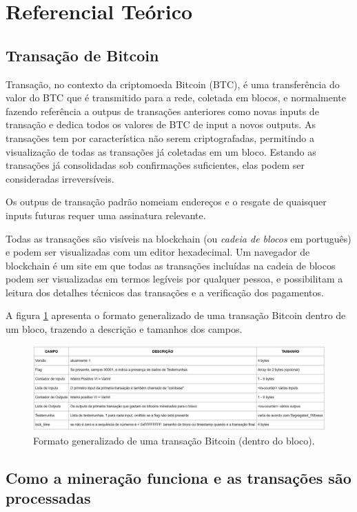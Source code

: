 \documentclass[conference]{IEEEtran}
\begin{document}
\section{Referencial Teórico}

\subsection{Transação de Bitcoin}

Transação, no contexto da criptomoeda Bitcoin (BTC),  é uma transferência do valor do BTC que é transmitido para a rede, coletada em blocos, e normalmente fazendo referência a outpus de transações anteriores como novas inputs de transação e dedica todos os valores de BTC de input a novos outputs. As transações tem por característica não serem  criptografadas, permitindo a visualização de todas as transações já coletadas em um bloco. Estando as transações já consolidadas sob confirmações suficientes, elas podem ser consideradas irreversíveis.

Os outpus de transação padrão nomeiam endereços e o resgate de quaisquer inputs futuras requer uma assinatura relevante.

Todas as transações são visíveis na blockchain (ou \emph{cadeia de blocos} em português) e podem ser visualizadas com um editor hexadecimal. Um navegador de blockchain é um site em que todas as transações incluídas na cadeia de blocos podem ser visualizadas em termos legíveis por qualquer pessoa, e possibilitam a leitura dos detalhes técnicos das transações e a verificação dos pagamentos.

A figura \ref{tabela} apresenta o formato generalizado de uma transação Bitcoin dentro de um bloco, trazendo a descrição e tamanhos dos campos. 

\begin{figure}[h]
\centerline{\includegraphics[width=.5\textwidth]{imgs/tabela.JPG}}
\caption{Formato generalizado de uma transação Bitcoin (dentro do bloco).}
\label{tabela}
\end{figure}




\subsection{Como a mineração funciona e as transações são processadas}
\end{document}
